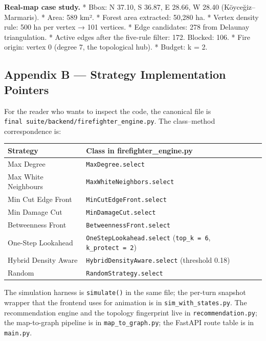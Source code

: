 \documentclass[
  11pt,
]{article}
\newcounter{none} %
\begin{document}
\textbf{Real-map case study.} * Bbox: N 37.10, S 36.87, E 28.66, W 28.40
(Köyceğiz--Marmaris). * Area: 589 km². * Forest area extracted: 50,280
ha. * Vertex density rule: 500 ha per vertex → 101 vertices. * Edge
candidates: 278 from Delaunay triangulation. * Active edges after the
five-rule filter: 172. Blocked: 106. * Fire origin: vertex 0 (degree 7,
the topological hub). * Budget: k = 2.

\subsection{Appendix B --- Strategy Implementation
Pointers}\label{appendix-b-strategy-implementation-pointers}

For the reader who wants to inspect the code, the canonical file is
\texttt{final\ suite/backend/firefighter\_engine.py}. The class--method
correspondence is:

{\def\LTcaptype{none} %
\begin{longtable}[]{@{}
  >{\raggedright\arraybackslash}p{}
  >{\raggedright\arraybackslash}p{}@{}}
\toprule\noalign{}
\begin{minipage}[b]{\linewidth}\raggedright
Strategy
\end{minipage} & \begin{minipage}[b]{\linewidth}\raggedright
Class in firefighter\_engine.py
\end{minipage} \\
\midrule\noalign{}
\endhead
\bottomrule\noalign{}
\endlastfoot
Max Degree & \texttt{MaxDegree.select} \\
Max White Neighbours & \texttt{MaxWhiteNeighbors.select} \\
Min Cut Edge Front & \texttt{MinCutEdgeFront.select} \\
Min Damage Cut & \texttt{MinDamageCut.select} \\
Betweenness Front & \texttt{BetweennessFront.select} \\
One-Step Lookahead & \texttt{OneStepLookahead.select}
(\texttt{top\_k\ =\ 6}, \texttt{k\_protect\ =\ 2}) \\
Hybrid Density Aware & \texttt{HybridDensityAware.select} (threshold
0.18) \\
Random & \texttt{RandomStrategy.select} \\
\end{longtable}
}

The simulation harness is \texttt{simulate()} in the same file; the
per-turn snapshot wrapper that the frontend uses for animation is in
\texttt{sim\_with\_states.py}. The recommendation engine and the
topology fingerprint live in \texttt{recommendation.py}; the
map-to-graph pipeline is in \texttt{map\_to\_graph.py}; the FastAPI
route table is in \texttt{main.py}.
\end{document}
